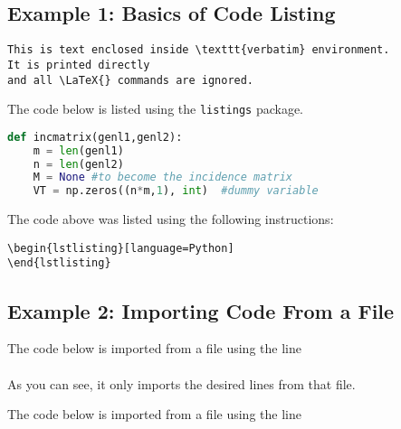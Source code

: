 \documentclass[utf8]{my_class_1_front_vanc}  %
\begin{document}
\subsection{Example 1: Basics of Code Listing}

\begin{verbatim}
This is text enclosed inside \texttt{verbatim} environment.
It is printed directly 
and all \LaTeX{} commands are ignored.
\end{verbatim}

The code below is listed using the {\tt listings} package.

\begin{lstlisting}[language=Python]
def incmatrix(genl1,genl2):
    m = len(genl1)
    n = len(genl2)
    M = None #to become the incidence matrix
    VT = np.zeros((n*m,1), int)  #dummy variable
\end{lstlisting}

The code above was listed using the following instructions:

\begin{verbatim}
\begin{lstlisting}[language=Python]
\end{lstlisting}
\end{verbatim}

\subsection{Example 2: Importing Code From a File}

The code below is imported from a file using the line \\
\lstinline:: \\
As you can see, it only imports the desired lines from that file.




The code below is imported from a file using the line \\
\lstinline::
\end{document}
